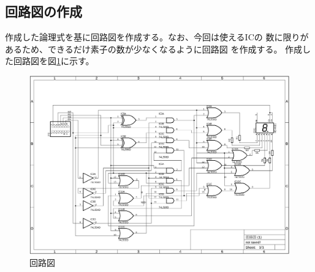\documentclass[a4paper,11pt,dvipdfmx]{jsarticle}
\begin{document}

\subsection{回路図の作成}
作成した論理式を基に回路図を作成する。なお、今回は使えるICの
数に限りがあるため、できるだけ素子の数が少なくなるように回路図
を作成する。
作成した回路図を図\ref{fig:circit}に示す。
\begin{figure}[h]
  \centering
  \includegraphics[width=15cm]{./images/circit.png}
  \caption{回路図}
  \label{fig:circit}
\end{figure}
\end{document}
